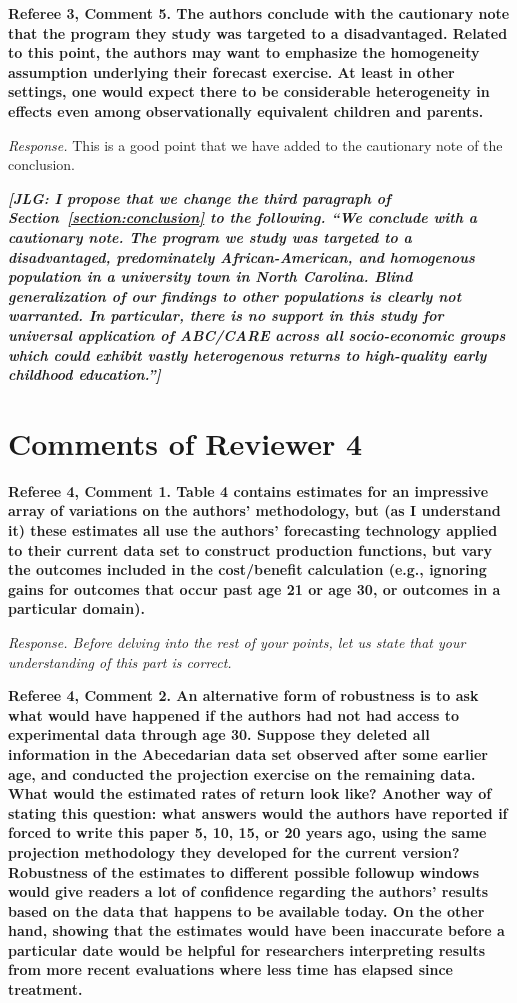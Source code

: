 \noindent \textbf{Referee 3, Comment 5. The authors conclude with the cautionary note that the program they study was targeted to a disadvantaged. Related to this point, the authors may want to emphasize the homogeneity assumption underlying their forecast exercise. At least in other settings, one would expect there to be considerable heterogeneity in effects even among observationally equivalent children and parents.}

\noindent \textit{Response.} This is a good point that we have added to the cautionary note of the conclusion.

\textit{\textbf{[JLG: I propose that we change the third paragraph of Section~\ref{section:conclusion} to the following. ``We conclude with a cautionary note. The program we study was targeted to a disadvantaged, predominately African-American, and homogenous population in a university town in North Carolina. Blind generalization of our findings to other populations is clearly not warranted. In particular, there is no support in this study for universal application of ABC/CARE across all socio-economic groups which could exhibit vastly heterogenous returns to high-quality early childhood education.'']}}

\section*{Comments of Reviewer 4}

\noindent \textbf{Referee 4, Comment 1. Table 4 contains estimates for an impressive array of variations on the authors' methodology, but (as I understand it) these estimates all use the authors' forecasting technology applied to their current data set to construct production functions, but vary the outcomes included in the cost/benefit calculation (e.g., ignoring gains for outcomes that occur past age 21 or age 30, or outcomes in a particular domain).}

\noindent \textit{Response. Before delving into the rest of your points, let us state that your understanding of this part is correct.}
 
\noindent \textbf{Referee 4, Comment 2. An alternative form of robustness is to ask what would have happened if the authors had not had access to experimental data through age 30. Suppose they deleted all information in the Abecedarian data set observed after some earlier age, and conducted the projection exercise on the remaining data. What would the estimated rates of return look like? Another way of stating this question: what answers would the authors have reported if forced to write this paper 5, 10, 15, or 20 years ago, using the same projection methodology they developed for the current version? Robustness of the estimates to different possible followup windows would give readers a lot of confidence regarding the authors' results based on the data that happens to be available today. On the other hand, showing that the estimates would have been inaccurate before a particular date would be helpful for researchers interpreting results from more recent evaluations where less time has elapsed since treatment.}

